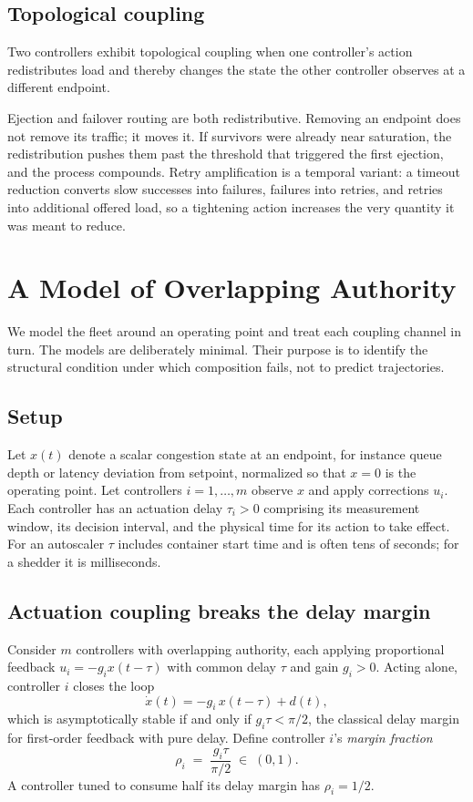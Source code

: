 \documentclass[conference]{IEEEtran}
\begin{document}
\subsection{Topological coupling}

Two controllers exhibit topological coupling when one controller's action
redistributes load and thereby changes the state the other controller
observes at a different endpoint.

Ejection and failover routing are both redistributive. Removing an endpoint
does not remove its traffic; it moves it. If survivors were already near
saturation, the redistribution pushes them past the threshold that triggered
the first ejection, and the process compounds. Retry amplification is a
temporal variant: a timeout reduction converts slow successes into failures,
failures into retries, and retries into additional offered load, so a
tightening action increases the very quantity it was meant to reduce.

\section{A Model of Overlapping Authority}
\label{sec:model}

We model the fleet around an operating point and treat each coupling channel
in turn. The models are deliberately minimal. Their purpose is to identify
the structural condition under which composition fails, not to predict
trajectories.

\subsection{Setup}

Let $x(t)$ denote a scalar congestion state at an endpoint, for instance
queue depth or latency deviation from setpoint, normalized so that $x=0$ is
the operating point. Let controllers $i = 1, \ldots, m$ observe $x$ and
apply corrections $u_i$. Each controller has an actuation delay $\tau_i > 0$
comprising its measurement window, its decision interval, and the physical
time for its action to take effect. For an autoscaler $\tau$ includes
container start time and is often tens of seconds; for a shedder it is
milliseconds.

\subsection{Actuation coupling breaks the delay margin}

Consider $m$ controllers with overlapping authority, each applying
proportional feedback $u_i = -g_i x(t - \tau)$ with common delay $\tau$ and
gain $g_i > 0$. Acting alone, controller $i$ closes the loop
\[
\dot{x}(t) = -g_i\, x(t - \tau) + d(t) ,
\]
which is asymptotically stable if and only if $g_i \tau < \pi/2$, the
classical delay margin for first-order feedback with pure delay. Define
controller $i$'s \emph{margin fraction}
\[
\rho_i \;=\; \frac{g_i \tau}{\pi/2} \;\in\; (0,1) .
\]
A controller tuned to consume half its delay margin has $\rho_i = 1/2$.
\end{document}
